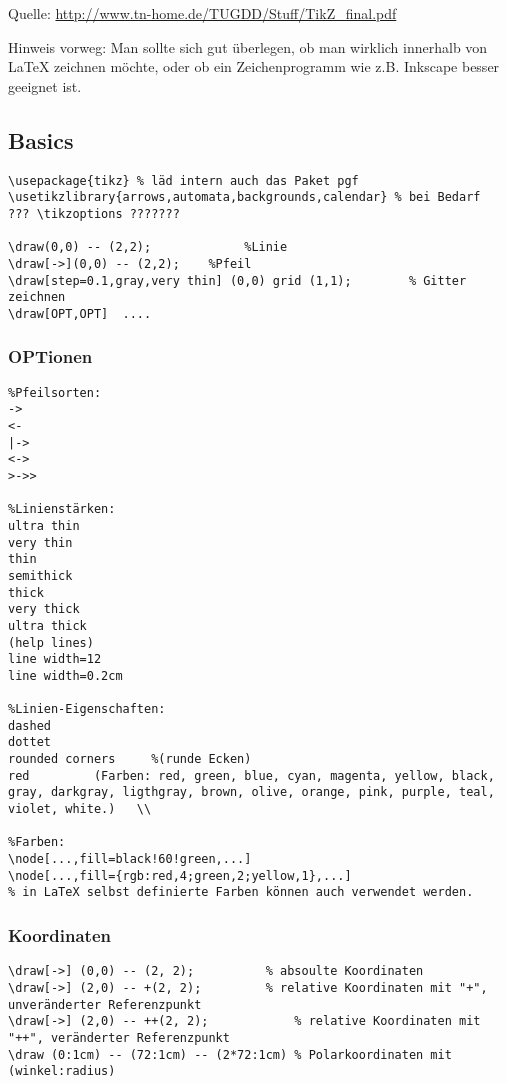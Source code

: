 \mycolumnbreak
{}
Quelle:	\url{http://www.tn-home.de/TUGDD/Stuff/TikZ_final.pdf}

Hinweis vorweg: Man sollte sich gut überlegen, ob man wirklich innerhalb von LaTeX zeichnen möchte, oder ob ein Zeichenprogramm wie z.B. Inkscape besser geeignet ist.


\subsection{Basics}
\begin{lstlisting}
\usepackage{tikz} % läd intern auch das Paket pgf
\usetikzlibrary{arrows,automata,backgrounds,calendar} % bei Bedarf
??? \tikzoptions ???????	

\draw(0,0) -- (2,2); 			 %Linie
\draw[->](0,0) -- (2,2);	%Pfeil
\draw[step=0.1,gray,very thin] (0,0) grid (1,1);		% Gitter zeichnen
\draw[OPT,OPT]  ....
\end{lstlisting}

\subsubsection{OPTionen}
\begin{lstlisting}
%Pfeilsorten:
->
<-
|-> 
<-> 
>->>

%Linienstärken:
ultra thin
very thin
thin
semithick
thick
very thick
ultra thick
(help lines)
line width=12
line width=0.2cm

%Linien-Eigenschaften:
dashed
dottet
rounded corners 	%(runde Ecken)
red			(Farben: red, green, blue, cyan, magenta, yellow, black, gray, darkgray, ligthgray, brown, olive, orange, pink, purple, teal, violet, white.)	\\

%Farben:
\node[...,fill=black!60!green,...]
\node[...,fill={rgb:red,4;green,2;yellow,1},...]
% in LaTeX selbst definierte Farben können auch verwendet werden.
\end{lstlisting}

\subsubsection{Koordinaten}
\begin{lstlisting}
\draw[->] (0,0) -- (2, 2);			% absoulte Koordinaten
\draw[->] (2,0) -- +(2, 2);			% relative Koordinaten mit "+", unveränderter Referenzpunkt
\draw[->] (2,0) -- ++(2, 2);			% relative Koordinaten mit "++", veränderter Referenzpunkt
\draw (0:1cm) -- (72:1cm) -- (2*72:1cm)	% Polarkoordinaten mit (winkel:radius)
\end{lstlisting}

